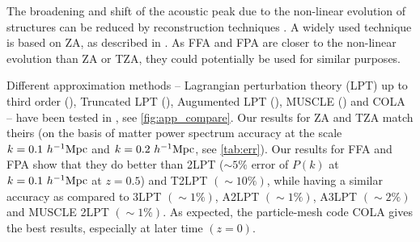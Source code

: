 The broadening and shift of the acoustic peak due to the non-linear evolution of structures can be reduced by reconstruction techniques \parencite{2007ApJ...664..675E}. A widely used technique is based on ZA, as described in \textcite{10.1111/j.1365-2966.2012.21888.x}. As FFA and FPA are closer to the non-linear evolution than ZA or TZA, they could potentially be used for similar purposes.

Different approximation methods -- Lagrangian perturbation theory (LPT) up to third order (\cite{10.1093/mnras/264.2.375}), Truncated LPT (\cite{1993MNRAS.260..765C}), Augumented LPT (\cite{10.1093/mnrasl/slt101}), MUSCLE (\cite{10.1093/mnrasl/slv141}) and COLA -- have been tested in \textcite{2017JCAP...07..050M}, see \autoref{fig:app_compare}. Our results for ZA and TZA match theirs (on the basis of matter power spectrum accuracy at the scale $k=0.1~h^{-1}\text{Mpc}$ and $k=0.2~h^{-1}\text{Mpc}$, see \autoref{tab:err}). Our results for FFA and FPA show that they do better than 2LPT ($\sim5\%$ error of $P(k)$ at $k=0.1~h^{-1}\text{Mpc}$ at $z=0.5$) and T2LPT $(\sim10\%)$, while having a similar accuracy as compared to 3LPT $(\sim1\%)$, A2LPT $(\sim1\%)$, A3LPT $(\sim2\%)$ and MUSCLE 2LPT $(\sim1\%)$. As expected, the particle-mesh code COLA gives the best results, especially at later time $(z=0)$.

